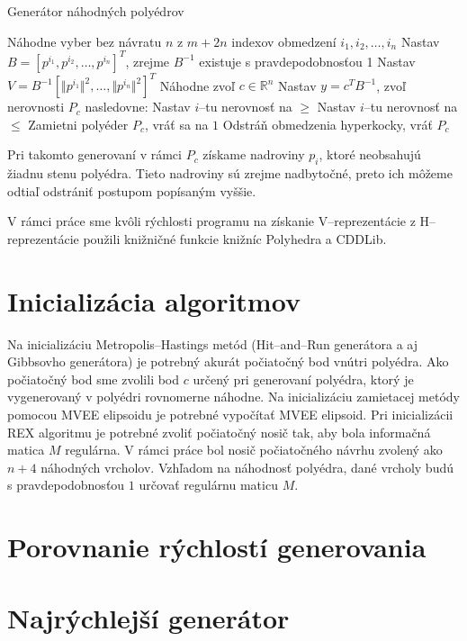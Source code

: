 \begin{algorithm}[H]
	\caption{Generátor náhodných polyédrov \cite{may_random}}
	\label{generator-polyedrov}
	\begin{algorithmic}[1]
		\State Náhodne vyber bez návratu $n$ z $m+2n$ indexov obmedzení $i_1, i_2, \dots, i_n$
		\State Nastav $B=[p^{i_1}, p^{i_2}, \dots, p^{i_n}]^T$, zrejme $B^{-1}$ existuje s pravdepodobnosťou 1
		\State Nastav $V=B^{-1}[\Vert p^{i_1}\Vert ^2, \dots, \Vert p^{i_n}\Vert ^2]^T$
		\State Náhodne zvoľ $c \in \mathbb{R}^n$
		\State Nastav $y=c^TB^{-1}$, zvoľ nerovnosti $P_c$ nasledovne:
				\State Nastav $i$--tu nerovnosť na $\ge$
			\Else
				\State Nastav $i$--tu nerovnosť na $\le$
			\EndIf
		\EndFor
			\State Zamietni polyéder $P_c$, vráť sa na $1$
		\Else
			\State Odstráň obmedzenia hyperkocky, vráť $P_c$
		\EndIf
	\end{algorithmic}
\end{algorithm}

Pri takomto generovaní v rámci $P_c$ získame nadroviny $p_i$, ktoré neobsahujú žiadnu stenu polyédra. Tieto nadroviny sú zrejme nadbytočné, preto ich môžeme odtiaľ odstrániť postupom popísaným vyššie.

V rámci práce sme kvôli rýchlosti programu na získanie V--reprezentácie z H--reprezentácie použili knižničné funkcie knižníc Polyhedra a CDDLib.

\section{Inicializácia algoritmov}

Na inicializáciu Metropolis--Hastings metód (Hit--and--Run generátora a aj Gibbsovho generátora) je potrebný akurát počiatočný bod vnútri polyédra. Ako počiatočný bod sme zvolili bod $c$ určený pri generovaní polyédra, ktorý je vygenerovaný v polyédri rovnomerne náhodne.
Na inicializáciu zamietacej metódy pomocou MVEE elipsoidu je potrebné vypočítať MVEE elipsoid. Pri inicializácii REX algoritmu je potrebné zvoliť počiatočný nosič tak, aby bola informačná matica $M$ regulárna. V rámci práce bol nosič počiatočného návrhu zvolený ako $n+4$ náhodných vrcholov. Vzhľadom na náhodnosť polyédra, dané vrcholy budú s pravdepodobnosťou $1$ určovať regulárnu maticu $M$.

\section{Porovnanie rýchlostí generovania}

\section{Najrýchlejší generátor}